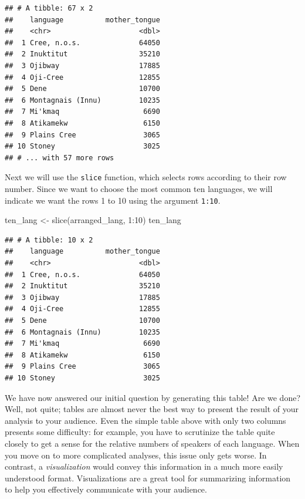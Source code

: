 \documentclass[
]{book}
\newenvironment{Shaded}{\begin{snugshade}}{\end{snugshade}}
\newcommand{\DecValTok}[1]{\textcolor[rgb]{0.06,0.06,0.06}{#1}}
\newcommand{\FunctionTok}[1]{\textcolor[rgb]{0,0,0}{#1}}
\newcommand{\NormalTok}[1]{#1}
\newcommand{\OtherTok}[1]{\textcolor[rgb]{0.37,0.37,0.37}{#1}}
\newcommand{\SpecialCharTok}[1]{\textcolor[rgb]{0,0,0}{#1}}
\begin{document}
\begin{verbatim}
## # A tibble: 67 x 2
##    language          mother_tongue
##    <chr>                     <dbl>
##  1 Cree, n.o.s.              64050
##  2 Inuktitut                 35210
##  3 Ojibway                   17885
##  4 Oji-Cree                  12855
##  5 Dene                      10700
##  6 Montagnais (Innu)         10235
##  7 Mi'kmaq                    6690
##  8 Atikamekw                  6150
##  9 Plains Cree                3065
## 10 Stoney                     3025
## # ... with 57 more rows
\end{verbatim}

Next we will use the \texttt{slice} function, which selects rows according to their
row number. Since we want to choose the most common ten languages, we will indicate we want the
rows 1 to 10 using the argument \texttt{1:10}.

\begin{Shaded}
\begin{Highlighting}[]
\NormalTok{ten\_lang }\OtherTok{\textless{}{-}} \FunctionTok{slice}\NormalTok{(arranged\_lang, }\DecValTok{1}\SpecialCharTok{:}\DecValTok{10}\NormalTok{)}
\NormalTok{ten\_lang}
\end{Highlighting}
\end{Shaded}

\begin{verbatim}
## # A tibble: 10 x 2
##    language          mother_tongue
##    <chr>                     <dbl>
##  1 Cree, n.o.s.              64050
##  2 Inuktitut                 35210
##  3 Ojibway                   17885
##  4 Oji-Cree                  12855
##  5 Dene                      10700
##  6 Montagnais (Innu)         10235
##  7 Mi'kmaq                    6690
##  8 Atikamekw                  6150
##  9 Plains Cree                3065
## 10 Stoney                     3025
\end{verbatim}

We have now answered our initial question by generating this table!
Are we done? Well, not quite; tables are almost never the best way to present
the result of your analysis to your audience. Even the simple table above with
only two columns presents some difficulty: for example, you have to scrutinize
the table quite closely to get a sense for the relative numbers of speakers of
each language. When you move on to more complicated analyses, this issue only
gets worse. In contrast, a \emph{visualization} would convey this information in a much
more easily understood format.
Visualizations are a great tool for summarizing information to help you
effectively communicate with your audience.
\end{document}
